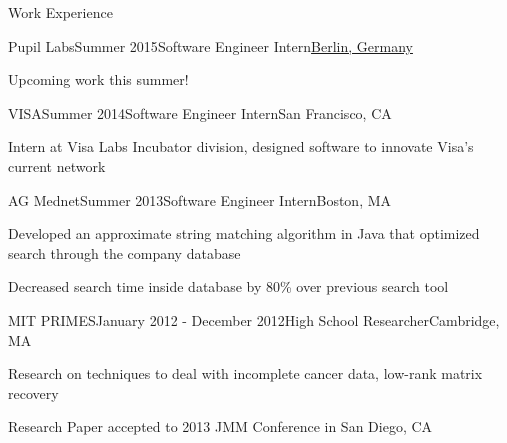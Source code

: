 \documentclass{resume} %
\begin{document}
\begin{rSection}{Work Experience}

\begin{rSubsection}{Pupil Labs}{Summer 2015}{Software Engineer Intern}{\underline{Berlin, Germany}}
\item Upcoming work this summer!
\end{rSubsection}


\begin{rSubsection}{VISA}{Summer 2014}{Software Engineer Intern}{San Francisco, CA}
\item Intern at Visa Labs Incubator division, designed software to innovate Visa’s current network
\end{rSubsection}


\begin{rSubsection}{AG Mednet}{Summer 2013}{Software Engineer Intern}{Boston, MA}
\item Developed an approximate string matching algorithm in Java that optimized search through the company database
\item Decreased search time inside database by 80\% over previous search tool
\end{rSubsection}


\begin{rSubsection}{MIT PRIMES}{January 2012 - December 2012}{High School Researcher}{Cambridge, MA}
\item Research on techniques to deal with incomplete cancer data, low-rank matrix recovery
\item Research Paper accepted to 2013 JMM Conference in San Diego, CA
\end{rSubsection}

\end{rSection}

\end{document}
